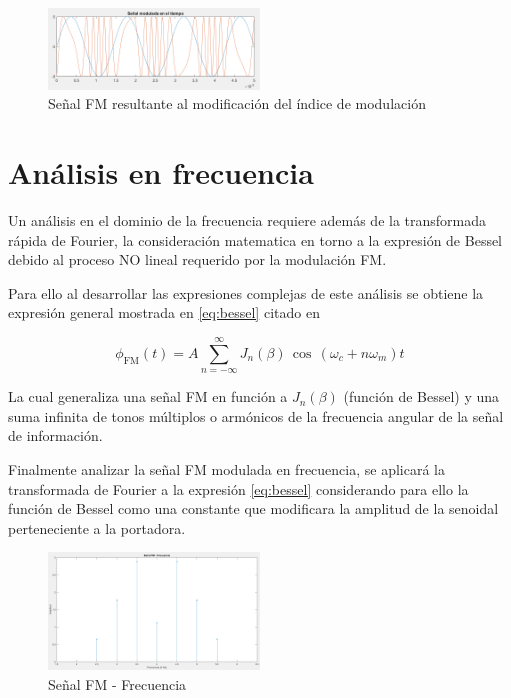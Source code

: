 \documentclass[conference]{IEEEtran}
\begin{document}
	\begin{figure}[h]
		\centering
		\includegraphics[width=0.5\textwidth]{media/mod-indice-modulacion}
		\caption{Señal FM resultante al modificación del índice de modulación}
		\label{fig:mod-indice-modulacion}
	\end{figure}
	
	\section{Análisis en frecuencia}
	
	Un análisis en el dominio de la frecuencia requiere además de la transformada rápida de Fourier, la consideración matematica en torno a la expresión de Bessel debido al proceso NO lineal requerido por la modulación FM.
	
	Para ello al desarrollar las expresiones complejas de este análisis se obtiene la expresión general mostrada en \ref{eq:bessel} citado en \cite{stremler2006}
	
	\begin{equation}
		\phi_{\textrm{FM}}(t) = A \sum_{n=-\infty}^{\infty} J_n(\beta) \, \cos\, (\omega_c + n\omega_m) t
		\label{eq:bessel}
	\end{equation}
	
	La cual generaliza una señal FM en función a $J_n(\beta)$ (función de Bessel) y una suma infinita de tonos múltiplos o armónicos de la frecuencia angular de la señal de información.
	
	Finalmente analizar la señal FM modulada en frecuencia, se aplicará la transformada de Fourier a la expresión \ref{eq:bessel} considerando para ello la función de Bessel como una constante que modificara la amplitud de la senoidal perteneciente a la portadora.
	
	\begin{figure}[h]
		\centering
		\includegraphics[width=0.5\textwidth]{media/fm-frecuencia-bessel}
		\caption{Señal FM - Frecuencia}
		\label{fig:fm-frecuencia-bessel}
	\end{figure}
	
\end{document}
